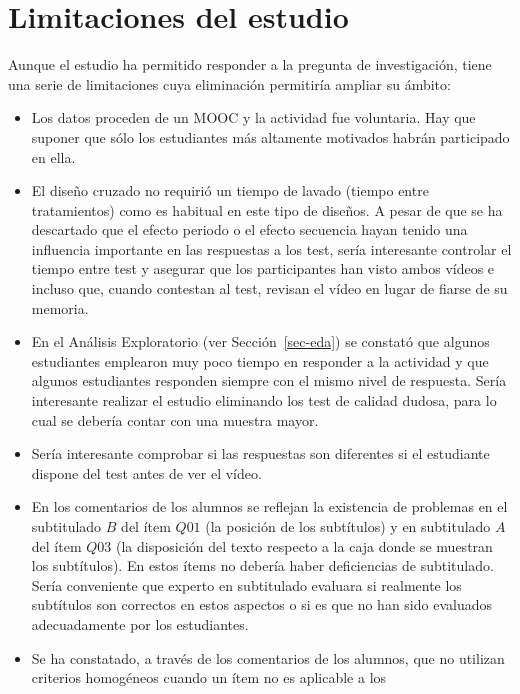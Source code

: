 \documentclass[
  12pt,
  a4paper,
  extrafontsizes,
  onecolumn,
  openright,
  table]{memoir}
\providecommand{\tightlist}{%
  \setlength{\itemsep}{0pt}\setlength{\parskip}{0pt}}\usepackage{longtable,booktabs,array}
\begin{document}
\hypertarget{limitaciones-del-estudio}{%
\section{Limitaciones del estudio}\label{limitaciones-del-estudio}}

Aunque el estudio ha permitido responder a la pregunta de investigación,
tiene una serie de limitaciones cuya eliminación permitiría ampliar su
ámbito:

\begin{itemize}
\tightlist
\item
  Los datos proceden de un MOOC y la actividad fue voluntaria. Hay que
  suponer que sólo los estudiantes más altamente motivados habrán
  participado en ella.
\item
  El diseño cruzado no requirió un tiempo de lavado (tiempo entre
  tratamientos) como es habitual en este tipo de diseños. A pesar de que
  se ha descartado que el efecto periodo o el efecto secuencia hayan
  tenido una influencia importante en las respuestas a los test, sería
  interesante controlar el tiempo entre test y asegurar que los
  participantes han visto ambos vídeos e incluso que, cuando contestan
  al test, revisan el vídeo en lugar de fiarse de su memoria.
\item
  En el Análisis Exploratorio (ver Sección~\ref{sec-eda}) se constató
  que algunos estudiantes emplearon muy poco tiempo en responder a la
  actividad y que algunos estudiantes responden siempre con el mismo
  nivel de respuesta. Sería interesante realizar el estudio eliminando
  los test de calidad dudosa, para lo cual se debería contar con una
  muestra mayor.
\item
  Sería interesante comprobar si las respuestas son diferentes si el
  estudiante dispone del test antes de ver el vídeo.
\item
  En los comentarios de los alumnos se reflejan la existencia de
  problemas en el subtitulado \(B\) del ítem \(Q01\) (la posición de los
  subtítulos) y en subtitulado \(A\) del ítem \(Q03\) (la disposición
  del texto respecto a la caja donde se muestran los subtítulos). En
  estos ítems no debería haber deficiencias de subtitulado. Sería
  conveniente que experto en subtitulado evaluara si realmente los
  subtítulos son correctos en estos aspectos o si es que no han sido
  evaluados adecuadamente por los estudiantes.
\item
  Se ha constatado, a través de los comentarios de los alumnos, que no
  utilizan criterios homogéneos cuando un ítem no es aplicable a los

\end{itemize}
\end{document}
